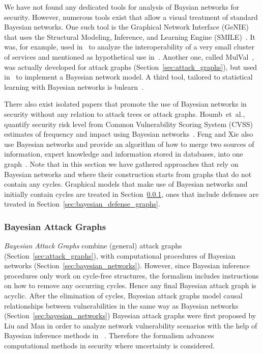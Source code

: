 \documentclass[a4paper]{article}
\begin{document}
We have not found any dedicated tools for analysis of Baysian networks for 
security. However, numerous tools exist that allow a visual treatment of 
standard Bayesian networks. One such tool is the Graphical Network Interface
(GeNIE) that uses the Structural Modeling, Inference, and Learning Engine
(SMILE)~\cite{Website_Genie}. It was, for example, used in~\cite{NaJoLaFrEk} to
analyze the interoperability of a very small cluster of services and mentioned
as hypothetical use in~\cite{FrSoEkJo}. Another one, called
MulVal~\cite{OuGoAp}, was actually developed for attack graphs 
(Section~\ref{sec:attack_graphs}), but used in~\cite{XiLiOuLiLe} to implement a
Bayesian network model. A third tool, tailored to statistical learning with 
Bayesian networks is bnlearn~\cite{Scut}.

There also exist isolated papers that promote the use of Bayesian networks in
security without any relation to attack trees or attack graphs. Houmb~et~al.,
quantify security risk level from Common Vulnerability Scoring System (CVSS)
estimates of frequency and impact using Bayesian networks~\cite{HoFrEn}. Feng
and Xie also use Bayesian networks and provide an algorithm of how to merge two
sources of information, expert knowledge and information stored in databases,
into one graph~\cite{FeXi}. Note that in this section we have gathered
approaches that rely on Bayesian networks and where their construction starts
from graphs that do not contain any cycles. Graphical models that make use of
Bayesian networks and initially contain cycles are treated in
Section~\ref{sec:bayesian_attack_graphs}, ones that include defenses are treated
in Section~\ref{sec:bayesian_defense_graphs}.

\subsubsection{Bayesian Attack Graphs} 
\label{sec:bayesian_attack_graphs}

\emph{Bayesian Attack Graphs} combine (general) attack graphs
(Section~\ref{sec:attack_graphs}), with computational procedures of Bayesian
networks (Section~\ref{sec:bayesian_networks}). However, since Bayesian
inference procedures only work on cycle-free structures, the formalism includes
instructions on how to remove any occurring cycles. Hence any final Bayesian
attack graph is acyclic. After the elimination of cycles, Bayesian attack graphs
model causal relationships between vulnerabilities in the same way as Bayesian
networks (Section~\ref{sec:bayesian_networks}) Bayesian attack graphs were first
proposed by Liu and Man in order to analyze network vulnerability scenarios with
the help of Bayesian inference methods in ~\cite{LiMa}. Therefore the
formalism advances computational methods in security where uncertainty is
considered.
\end{document}
